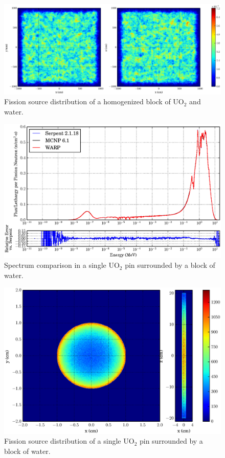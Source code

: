 \begin{figure}[h!]
\centering
\includegraphics[width=\textwidth,trim= 2cm 0cm 2cm 0cm]{graphics/finalresults/homfuel_fiss-6.eps}
\caption{Fission source distribution of a homogenized block of UO$_2$ and water. \label{homfuel_fiss} }
\end{figure}

\begin{figure}[h!] 
\centering
\includegraphics[width=\textwidth]{graphics/finalresults/pincell_spec-6.eps}
\caption{Spectrum comparison in a single UO$_2$ pin surrounded by a block of water. \label{pincell_spec} }
\end{figure}

\begin{figure}[h!]
\centering
\includegraphics[width=.8\textwidth]{graphics/finalresults/pincell_fiss-6.eps}
\caption{Fission source distribution of a single UO$_2$ pin surrounded by a block of water. \label{pincell_fiss} }
\end{figure}

